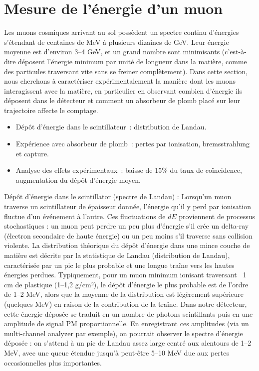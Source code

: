 \documentclass[a4paper,12pt,twoside]{article}
\begin{document}
\newpage

\section{Mesure de l’énergie d’un muon}
Les muons cosmiques arrivant au sol possèdent un spectre continu d’énergies s’étendant de centaines de MeV à plusieurs dizaines de GeV. Leur énergie moyenne est d’environ 3–4 GeV, et un grand nombre sont minimisants (c’est-à-dire déposent l’énergie minimum par unité de longueur dans la matière, comme des particules traversant vite sans se freiner complètement). Dans cette section, nous cherchons à caractériser expérimentalement la manière dont les muons interagissent avec la matière, en particulier en observant combien d’énergie ils déposent dans le détecteur et comment un absorbeur de plomb placé sur leur trajectoire affecte le comptage.

\begin{itemize}
  \item Dépôt d’énergie dans le scintillateur : distribution de Landau.
  \item Expérience avec absorbeur de plomb : pertes par ionisation, bremsstrahlung et capture.
  \item Analyse des effets expérimentaux : baisse de 15\% du taux de coïncidence, augmentation du dépôt d’énergie moyen.
\end{itemize}

Dépôt d’énergie dans le scintillator (spectre de Landau) : Lorsqu’un muon traverse un scintillateur de épaisseur donnée, l’énergie qu’il y perd par ionisation fluctue d’un événement à l’autre. Ces fluctuations de $dE$ proviennent de processus stochastiques : un muon peut perdre un peu plus d’énergie s’il crée un delta-ray (électron secondaire de haute énergie) ou un peu moins s’il traverse sans collision violente. La distribution théorique du dépôt d’énergie dans une mince couche de matière est décrite par la statistique de Landau (distribution de Landau), caractérisée par un pic le plus probable et une longue traîne vers les hautes énergies perdues. Typiquement, pour un muon minimum ionisant traversant ~1 cm de plastique (1–1,2 g/cm²), le dépôt d’énergie le plus probable est de l’ordre de 1–2 MeV, alors que la moyenne de la distribution est légèrement supérieure (quelques MeV) en raison de la contribution de la traîne. Dans notre détecteur, cette énergie déposée se traduit en un nombre de photons scintillants puis en une amplitude de signal PM proportionnelle. En enregistrant ces amplitudes (via un multi-channel analyzer par exemple), on pourrait observer le spectre d’énergie déposée : on s’attend à un pic de Landau assez large centré aux alentours de 1–2 MeV, avec une queue étendue jusqu’à peut-être 5–10 MeV due aux pertes occasionnelles plus importantes.
\end{document}
